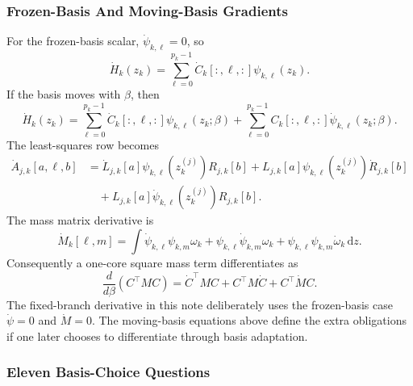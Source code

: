 \documentclass[11pt]{article}
\numberwithin{equation}{section}
\newcommand{\dd}{\,\mathrm d}
\begin{document}
\subsubsection{Frozen-Basis And Moving-Basis Gradients}

For the frozen-basis scalar, \(\dot\psi_{k,\ell}=0\), so
\begin{equation}
    \dot H_k(z_k)
    =
    \sum_{\ell=0}^{p_k-1}
    \dot C_k[:,\ell,:]\psi_{k,\ell}(z_k).
    \label{eq:p33-frozen-hdot}
\end{equation}
If the basis moves with \(\beta\), then
\begin{equation}
    \dot H_k(z_k)
    =
    \sum_{\ell=0}^{p_k-1}
    \dot C_k[:,\ell,:]\psi_{k,\ell}(z_k;\beta)
    +
    \sum_{\ell=0}^{p_k-1}
    C_k[:,\ell,:]\dot\psi_{k,\ell}(z_k;\beta).
    \label{eq:p33-moving-hdot}
\end{equation}
The least-squares row becomes
\begin{equation}
\begin{aligned}
    \dot A_{j,k}[a,\ell,b]
    &=
    \dot L_{j,k}[a]\psi_{k,\ell}(z_k^{(j)})R_{j,k}[b]
    +L_{j,k}[a]\psi_{k,\ell}(z_k^{(j)})\dot R_{j,k}[b]\\
    &\quad+
    L_{j,k}[a]\dot\psi_{k,\ell}(z_k^{(j)})R_{j,k}[b].
\end{aligned}
    \label{eq:p33-moving-row}
\end{equation}
The mass matrix derivative is
\begin{equation}
    \dot M_k[\ell,m]
    =
    \int
    \dot\psi_{k,\ell}\psi_{k,m}\omega_k
    +
    \psi_{k,\ell}\dot\psi_{k,m}\omega_k
    +
    \psi_{k,\ell}\psi_{k,m}\dot\omega_k
    \dd z.
    \label{eq:p33-moving-mass}
\end{equation}
Consequently a one-core square mass term differentiates as
\begin{equation}
    \frac{d}{d\beta}(C^\top M C)
    =
    \dot C^\top MC+C^\top M\dot C+C^\top\dot M C.
    \label{eq:p33-moving-square-derivative}
\end{equation}
The fixed-branch derivative in this note deliberately uses the frozen-basis
case \(\dot\psi=0\) and \(\dot M=0\).  The moving-basis equations above define
the extra obligations if one later chooses to differentiate through basis
adaptation.

\subsubsection{Eleven Basis-Choice Questions}
\end{document}

